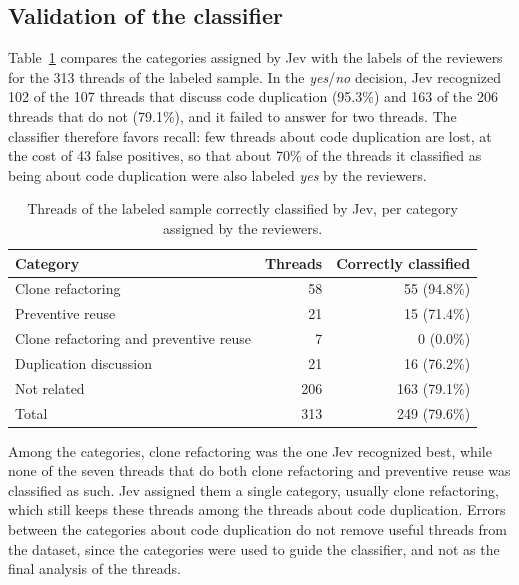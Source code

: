 \subsection{Validation of the classifier}
\label{sec:results-validation}

Table~\ref{tab:results-jev} compares the categories assigned by Jev with the labels of the reviewers for the 313 threads of the labeled sample. In the \emph{yes}/\emph{no} decision, Jev recognized 102 of the 107 threads that discuss code duplication (95.3\%) and 163 of the 206 threads that do not (79.1\%), and it failed to answer for two threads. The classifier therefore favors recall: few threads about code duplication are lost, at the cost of 43 false positives, so that about 70\% of the threads it classified as being about code duplication were also labeled \emph{yes} by the reviewers.

\begin{table}[htbp]
    \centering
    \caption{Threads of the labeled sample correctly classified by Jev, per category assigned by the reviewers.}
    \label{tab:results-jev}
    \begin{tabular}{lrr}
        \hline
        Category & Threads & Correctly classified \\
        \hline
        Clone refactoring                        &  58 &  55 (94.8\%) \\
        Preventive reuse                         &  21 &  15 (71.4\%) \\
        Clone refactoring and preventive reuse   &   7 &   0 (0.0\%)  \\
        Duplication discussion                   &  21 &  16 (76.2\%) \\
        Not related                              & 206 & 163 (79.1\%) \\
        \hline
        Total                                    & 313 & 249 (79.6\%) \\
        \hline
    \end{tabular}
\end{table}

Among the categories, clone refactoring was the one Jev recognized best, while none of the seven threads that do both clone refactoring and preventive reuse was classified as such. Jev assigned them a single category, usually clone refactoring, which still keeps these threads among the threads about code duplication. Errors between the categories about code duplication do not remove useful threads from the dataset, since the categories were used to guide the classifier, and not as the final analysis of the threads.

